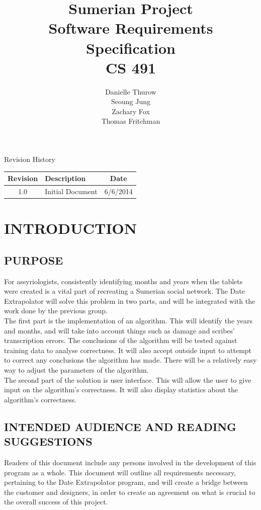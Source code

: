 \documentclass[11pt]{article}
\title{Sumerian Project\\
Software Requirements Specification\\
CS 491}
\author{Danielle Thurow \\
Seoung Jung\\
Zachary Fox\\
Thomas Fritchman}
\date{}
\begin{document}
\maketitle
\newpage

\tableofcontents
\newpage

\begin{center}
\Large Revision History\\
\begin{tabularx}{\textwidth}{|c|X|c|}
    \hline
    \textbf{Revision} & \textbf{Description} & \textbf{Date}\\ \hline
    1.0 & Initial Document & 6/6/2014\\ \hline
\end{tabularx}
\end{center}
\newpage

\section{INTRODUCTION}
\subsection{PURPOSE}
For assyriologists, consistently identifying months and years when the tablets were created is a vital part of recreating a Sumerian social network. The Date Extrapolator will solve this problem in two parts, and will be integrated with the work done by the previous group.\\

The first part is the implementation of an algorithm. This will identify the years and months, and will take into account things such as damage and scribes’ transcription errors. The conclusions of the algorithm will be tested against training data to analyse correctness. It will also accept outside input to attempt to correct any conclusions the algorithm has made. There will be a relatively easy way to adjust the parameters of the algorithm.\\

The second part of the solution is user interface. This will allow the user to give input on the algorithm’s correctness. It will also display statistics about the algorithm’s correctness.

\subsection{INTENDED AUDIENCE AND READING SUGGESTIONS}
Readers of this document include any persons involved in the development of this program as a whole. This document will outline all requirements necessary, pertaining to the Date Extrapolator program, and will create a bridge between the customer and designers, in order to create an agreement on what is crucial to the overall success of this project. 
\end{document}
